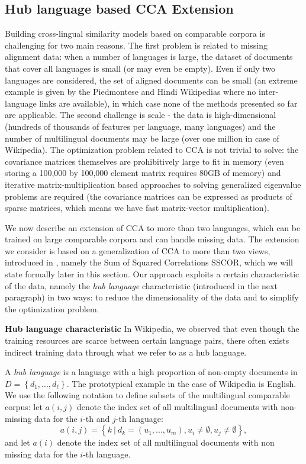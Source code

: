 \documentclass[twoside,11pt]{article}
\begin{document}
\subsection{Hub language based CCA Extension}\label{sec:hublang}
Building cross-lingual similarity models based on comparable corpora is challenging for two main reasons. The first problem is related to missing alignment data: when a number of languages is large, the dataset of documents that cover all languages is small (or may even be empty). Even if only two languages are considered, the set of aligned documents can be small (an extreme example is given by the Piedmontese and Hindi Wikipedias where no inter-language links are available), in which case none of the methods presented so far are applicable.
 The second challenge is scale - the data is high-dimensional (hundreds of thousands of features per language, many languages) and the number of multilingual documents may be large (over one million in case of Wikipedia). The optimization problem related to CCA is not
 trivial to solve: the covariance matrices themselves are prohibitively large to fit in memory (even storing a 100,000 by 100,000 element matrix requires 80GB of memory) and iterative matrix-multiplication based approaches to  solving generalized eigenvalue problems are required (the covariance matrices can be expressed as products of sparse matrices, which means we have fast matrix-vector multiplication).

We now describe an extension of CCA to more than two languages, which can be trained on large comparable corpora and can handle missing data.
 The extension we consider is based on a generalization of CCA to more than two views, introduced in \cite{Kettenring}, namely the Sum of Squared Correlations SSCOR, which we will state formally later in this section. Our approach exploits a certain characteristic of the data, namely the \emph{hub language} characteristic (introduced in the next paragraph) in two
 ways: to reduce the dimensionality of the data and to simplify the optimization problem.

\textbf{Hub language characteristic}
In Wikipedia, we observed that even though the training resources are scarce between certain language pairs, there often exists indirect training data through what we refer to as a hub language.

A \emph{hub language} is a language with a high proportion of non-empty documents in $D = \left\{d_1,..., d_{\ell}\right\}$. The prototypical example in the case of Wikipedia is English. We use the following notation to define subsets of the multilingual comparable corpus: let $a(i,j)$ denote the index set of all multilingual documents with non-missing data for the $i$-th and $j$-th language:  $$a(i,j) = \left\{k~ |~ d_k = (u_1,...,u_m), u_i \neq \emptyset, u_j \neq \emptyset \right\},$$ and let $a(i)$ denote the index set of all multilingual documents with non missing data for the $i$-th language.
\end{document}
